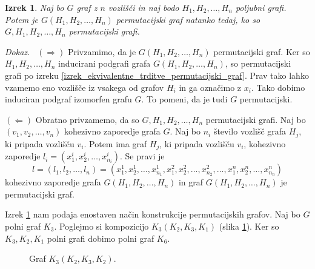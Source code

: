 \documentclass[a4paper, 12pt]{book}
\newtheorem{izrek}{Izrek}[chapter]
\newenvironment{dokaz}{\emph{Dokaz.}\ }{\hspace{\fill}{$\Box$}}
\begin{document}
\begin{izrek}
\label{izrek_konstrukcija_permutacijskega_grafa}
    Naj bo $G$ graf z $n$ vozlišči in naj bodo $H_1, H_2, \dots, H_n$ poljubni grafi. Potem je $G(H_1, H_2, \dots, H_n)$ permutacijski graf natanko tedaj, ko so $G, H_1, H_2, \dots, H_n$ permutacijski grafi.
\end{izrek}
\begin{dokaz}
    $(\Rightarrow)$ Privzamimo, da je $G(H_1, H_2, \dots, H_n)$ permutacijski graf. Ker so $H_1, H_2, \dots, H_n$ inducirani podgrafi grafa $G(H_1, H_2, \dots, H_n)$, so permutacijski grafi po izreku \ref{izrek_ekvivalentne_trditve_permutacijski_graf}. Prav tako lahko vzamemo eno vozlišče iz vsakega od grafov $H_i$ in ga označimo z $x_i$. Tako dobimo induciran podgraf izomorfen grafu $G$. To pomeni, da je tudi $G$ permutacijski. 
    
    $(\Leftarrow)$ Obratno privzamemo, da so $G, H_1, H_2, \dots, H_n$ permutacijski grafi. Naj bo $(v_1, v_2, \dots, v_n)$ kohezivno zaporedje grafa $G$. Naj bo $n_i$ število vozlišč grafa $H_j$, ki pripada vozlišču $v_i$. Potem ima graf $H_j$, ki pripada vozlišču $v_i$, kohezivno zaporedje $l_i = (x_1^i, x_2^i, \dots, x_{n_i}^i)$. Se pravi je 
    \[
        l = (l_1, l_2, \dots, l_n) = (x_1^1, x_2^1, \dots, x_{n_1}^1, x_1^2, x_2^2, \dots, x_{n_2}^2, \dots, x_1^n, x_2^n, \dots, x_{n_n}^n)
    \]
    kohezivno zaporedje grafa $G(H_1, H_2, \dots, H_n)$ in graf $G(H_1, H_2, \dots, H_n)$ je permutacijski graf.
\end{dokaz}

Izrek \ref{izrek_konstrukcija_permutacijskega_grafa} nam podaja enostaven način konstrukcije permutacijskih grafov. Naj bo $G$ polni graf $K_3$. Poglejmo si kompozicijo $K_3(K_2, K_3, K_1)$ (slika \ref{graf_kompozicija_primer2}). Ker so $K_3, K_2, K_1$ polni grafi dobimo polni graf $K_6$.

\begin{figure}[h]
    \begin{center}        
    \end{center}
    \caption{Graf $K_3(K_2, K_3, K_2)$.}
    \label{graf_kompozicija_primer2}
\end{figure}
\end{document}
